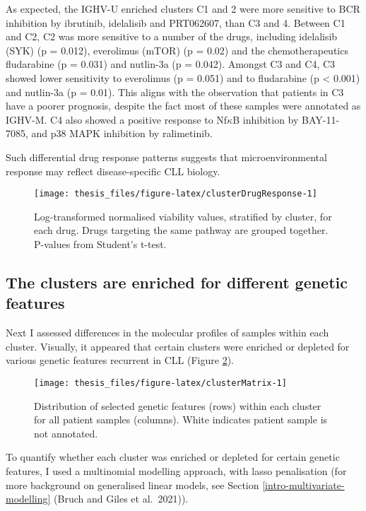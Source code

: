 \documentclass[11pt, a4paper, twosided]{book}
\begin{document}
As expected, the IGHV-U enriched clusters C1 and 2 were more sensitive to BCR inhibition by ibrutinib, idelalisib and PRT062607, than C3 and 4. Between C1 and C2, C2 was more sensitive to a number of the drugs, including idelalisib (SYK) (p = 0.012), everolimus (mTOR) (p = 0.02) and the chemotherapeutics fludarabine (p = 0.031) and nutlin-3a (p = 0.042). Amongst C3 and C4, C3 showed lower sensitivity to everolimus (p = 0.051) and to fludarabine (p \textless{} 0.001) and nutlin-3a (p = 0.01). This aligns with the observation that patients in C3 have a poorer prognosis, despite the fact most of these samples were annotated as IGHV-M. C4 also showed a positive response to Nf\(\kappa\)B inhibition by BAY-11-7085, and p38 MAPK inhibition by ralimetinib.

Such differential drug response patterns suggests that microenvironmental response may reflect disease-specific CLL biology.


\begin{figure}

{\centering \texttt{[image: thesis\_files/figure-latex/clusterDrugResponse-1]} 

}

\caption{Log-transformed normalised viability values, stratified by cluster, for each drug. Drugs targeting the same pathway are grouped together. P-values from Student's t-test.}\label{fig:clusterDrugResponse}
\end{figure}
\hypertarget{cluster-genetics}{%
\subsection{The clusters are enriched for different genetic features}\label{cluster-genetics}}

Next I assessed differences in the molecular profiles of samples within each cluster. Visually, it appeared that certain clusters were enriched or depleted for various genetic features recurrent in CLL (Figure \ref{fig:clusterMatrix}).


\begin{figure}

{\centering \texttt{[image: thesis\_files/figure-latex/clusterMatrix-1]} 

}

\caption{Distribution of selected genetic features (rows) within each cluster for all patient samples (columns). White indicates patient sample is not annotated.}\label{fig:clusterMatrix}
\end{figure}
To quantify whether each cluster was enriched or depleted for certain genetic features, I used a multinomial modelling approach, with lasso penalisation (for more background on generalised linear models, see Section \ref{intro-multivariate-modelling} (Bruch and Giles et al.~2021)).
\end{document}
